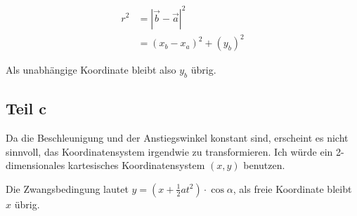 \documentclass[a4paper,german,12pt,smallheadings]{scrartcl}
\begin{document}
\begin{align*}
  r^2 &= |\vec{b} - \vec{a}|^2 \\
    &= (x_b-x_a)^2 + (y_b)^2
\end{align*}

Als unabhängige Koordinate bleibt also $y_b$ übrig.


\subsection*{Teil c}
Da die Beschleunigung und der Anstiegswinkel konstant sind, erscheint es nicht
sinnvoll, das Koordinatensystem irgendwie zu transformieren. Ich würde ein
2-dimensionales kartesisches Koordinatensystem $(x, y)$ benutzen.

Die Zwangsbedingung lautet $y = (x + \frac{1}{2}at^2) \cdot \cos \alpha$, als
freie Koordinate bleibt $x$ übrig.
\end{document}
